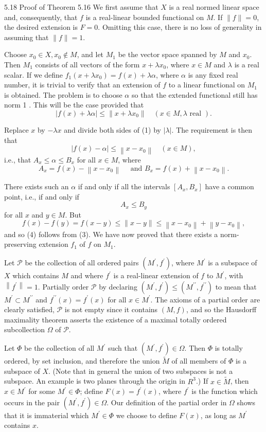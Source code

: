 5.18 Proof of Theorem 5.16 We first assume that $X$ is a real normed linear space and, consequently, that $f$ is a real-linear bounded functional on $M$. If $\|f\|=0$, the desired extension is $F=0$. Omitting this case, there is no loss of generality in assuming that $\|f\|=1$.

Choose $x_0 \in X, x_0 \notin M$, and let $M_1$ be the vector space spanned by $M$ and $x_0$. Then $M_1$ consists of all vectors of the form $x+\lambda x_0$, where $x \in M$ and $\lambda$ is a real scalar. If we define $f_1\left(x+\lambda x_0\right)=f(x)+\lambda \alpha$, where $\alpha$ is any fixed real number, it is trivial to verify that an extension of $f$ to a linear functional on $M_1$ is obtained. The problem is to choose $\alpha$ so that the extended functional still has norm 1 . This will be the case provided that
$$
|f(x)+\lambda \alpha| \leq\left\|x+\lambda x_0\right\| \quad(x \in M, \lambda \text { real }) .
$$

Replace $x$ by $-\lambda x$ and divide both sides of (1) by $|\lambda|$. The requirement is then that
$$
|f(x)-\alpha| \leq\left\|x-x_0\right\| \quad(x \in M),
$$
i.e., that $A_x \leq \alpha \leq B_x$ for all $x \in M$, where
$$
A_x=f(x)-\left\|x-x_0\right\| \quad \text { and } B_x=f(x)+\left\|x-x_0\right\| .
$$

There exists such an $\alpha$ if and only if all the intervals $\left[A_x, B_x\right]$ have a common point, i.e., if and only if
$$
A_x \leq B_y
$$
for all $x$ and $y \in M$. But
$$
f(x)-f(y)=f(x-y) \leq\|x-y\| \leq\left\|x-x_0\right\|+\left\|y-x_0\right\|,
$$
and so (4) follows from (3).
We have now proved that there exists a norm-preserving extension $f_1$ of $f$ on $M_1$.

Let $\mathscr{P}$ be the collection of all ordered pairs $\left(M^{\prime}, f^{\prime}\right)$, where $M^{\prime}$ is a subspace of $X$ which contains $M$ and where $f^{\prime}$ is a real-linear extension of $f$ to $M^{\prime}$, with $\left\|f^{\prime}\right\|=1$. Partially order $\mathscr{P}$ by declaring $\left(M^{\prime}, f^{\prime}\right) \leq\left(M^{\prime \prime}, f^{\prime \prime}\right)$ to mean that $M^{\prime} \subset M^{\prime \prime}$ and $f^{\prime \prime}(x)=f^{\prime}(x)$ for all $x \in M^{\prime}$. The axioms of a partial order are clearly satisfied, $\mathscr{P}$ is not empty since it contains $(M, f)$, and so the Hausdorff maximality theorem asserts the existence of a maximal totally ordered subcollection $\Omega$ of $\mathscr{P}$.

Let $\Phi$ be the collection of all $M^{\prime}$ such that $\left(M^{\prime}, f^{\prime}\right) \in \Omega$. Then $\Phi$ is totally ordered, by set inclusion, and therefore the union $\tilde{M}$ of all members of $\Phi$ is a subspace of $X$. (Note that in general the union of two subspaces is not a subspace. An example is two planes through the origin in $R^3$.) If $x \in \tilde{M}$, then $x \in M^{\prime}$ for some $M^{\prime} \in \Phi$; define $F(x)=f^{\prime}(x)$, where $f^{\prime}$ is the function which occurs in the pair $\left(M^{\prime}, f^{\prime}\right) \in \Omega$. Our definition of the partial order in $\Omega$ shows that it is immaterial which $M^{\prime} \in \Phi$ we choose to define $F(x)$, as long as $M^{\prime}$ contains $x$.

